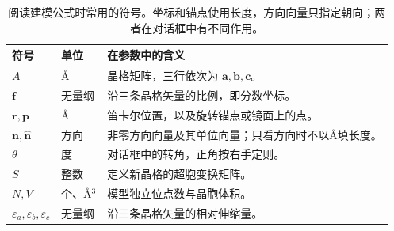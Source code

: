 \begin{table}[!htb]
\centering\small
\begin{tabularx}{\linewidth}{llX}
\toprule
符号 & 单位 & 在参数中的含义\\
\midrule
$A$ & \AA & 晶格矩阵，三行依次为 $\mathbf a,\mathbf b,\mathbf c$。\\
$\mathbf f$ & 无量纲 & 沿三条晶格矢量的比例，即分数坐标。\\
$\mathbf r,\mathbf p$ & \AA & 笛卡尔位置，以及旋转锚点或镜面上的点。\\
$\mathbf n,\hat{\mathbf n}$ & 方向 & 非零方向向量及其单位向量；只看方向时不以\AA 填长度。\\
$\theta$ & 度 & 对话框中的转角，正角按右手定则。\\
$S$ & 整数 & 定义新晶格的超胞变换矩阵。\\
$N,V$ & 个、\AA$^3$ & 模型独立位点数与晶胞体积。\\
$\varepsilon_a,\varepsilon_b,\varepsilon_c$ & 无量纲 & 沿三条晶格矢量的相对伸缩量。\\
\bottomrule
\end{tabularx}
\caption{阅读建模公式时常用的符号。坐标和锚点使用长度，方向向量只指定朝向；两者在对话框中有不同作用。}
\label{tab:round10-modeling-symbols}
\end{table}
